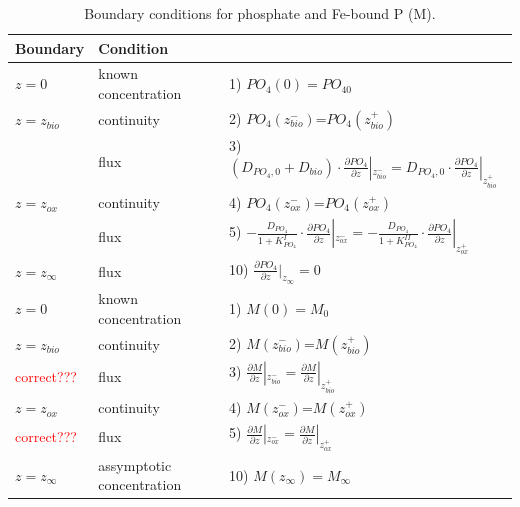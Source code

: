 \documentclass[gmd, manuscript]{copernicus}
\begin{document}
\begin{table}[tbp]
\caption{Boundary conditions for phosphate and Fe-bound P (M).}
\centering
\begin{tabular}{ |l| l| l|}
\hline
\textbf{Boundary}& \textbf{Condition}&\\
\hline
$z=0$& known concentration& 1) $PO_4(0)=PO_{40}$  \\
$z=z_{bio}$&continuity& 2) $PO_4(z_{bio}^-)$=$PO_4(z_{bio}^+)$\\
               & flux & 3) $\left(D_{PO_4,0}+D_{bio}\right )\cdot \frac{\partial PO_4}{\partial z}|_{z_{bio}^-}=D_{PO_4,0} \cdot \frac{\partial PO_4}{\partial z}|_{z_{bio}^+}$\\
$z=z_{ox}$& continuity& 4) $PO_4(z_{ox}^-)$=$PO_4(z_{ox}^+)$\\
               & flux & 5) $-\frac{D_{PO_4}}{1+K_{PO_4}^I} \cdot \frac{\partial PO_4}{\partial z}|_{z_{ox}^-} =-\frac{D_{PO_4}}{1+K_{PO_4}^{II}} \cdot \frac{\partial PO_4}{\partial z}|_{z_{ox}^+}$\\
$z=z_{\infty}$& flux & 10) $\frac{\partial PO_4}{\partial z}|_{z_\infty}=0$\\
\hline
$z=0$& known concentration& 1) $M(0)=M_0$  \\
$z=z_{bio}$&continuity& 2) $M(z_{bio}^-)$=$M(z_{bio}^+)$\\
 \textcolor{red}{correct???} & flux & 3) $\frac{\partial M}{\partial z}|_{z_{bio}^-}=\frac{\partial M}{\partial z}|_{z_{bio}^+}$\\
$z=z_{ox}$& continuity& 4) $M(z_{ox}^-)$=$M(z_{ox}^+)$\\
 \textcolor{red}{correct???} & flux & 5) $\frac{\partial M}{\partial z}|_{z_{ox}^-} =\frac{\partial M}{\partial z}|_{z_{ox}^+}$\\
$z=z_{\infty}$& assymptotic concentration & 10) $M(z_\infty)=M_\infty$\\
\hline    
\end{tabular}
\label{Tab:BC_PO4+M}
\end{table}
\end{document}

